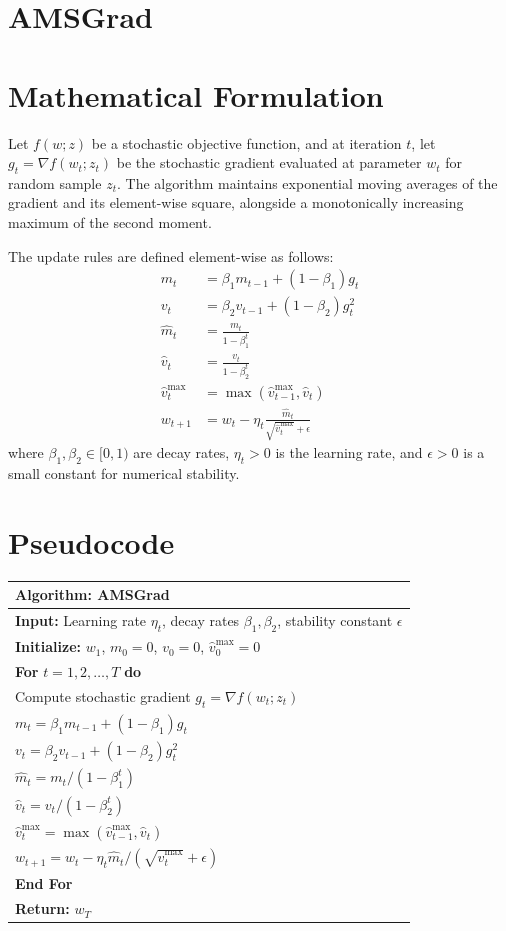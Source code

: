 \documentclass{article}
\begin{document}
\section*{AMSGrad}

\section*{Mathematical Formulation}
Let $f(w; z)$ be a stochastic objective function, and at iteration $t$, let $g_t = \nabla f(w_t; z_t)$ be the stochastic gradient evaluated at parameter $w_t$ for random sample $z_t$. The algorithm maintains exponential moving averages of the gradient and its element-wise square, alongside a monotonically increasing maximum of the second moment. 

The update rules are defined element-wise as follows:
\begin{align}
m_t &= \beta_1 m_{t-1} + (1-\beta_1) g_t \\
v_t &= \beta_2 v_{t-1} + (1-\beta_2) g_t^2 \\
\hat{m}_t &= \frac{m_t}{1-\beta_1^t} \\
\hat{v}_t &= \frac{v_t}{1-\beta_2^t} \\
\hat{v}_t^{\max} &= \max(\hat{v}_{t-1}^{\max}, \hat{v}_t) \\
w_{t+1} &= w_t - \eta_t \frac{\hat{m}_t}{\sqrt{\hat{v}_t^{\max}} + \epsilon}
\end{align}
where $\beta_1, \beta_2 \in [0,1)$ are decay rates, $\eta_t > 0$ is the learning rate, and $\epsilon > 0$ is a small constant for numerical stability.

\section*{Pseudocode}
\begin{center}
\begin{tabular}{l}
\hline
\textbf{Algorithm:} AMSGrad \\
\hline
\textbf{Input:} Learning rate $\eta_t$, decay rates $\beta_1, \beta_2$, stability constant $\epsilon$ \\
\textbf{Initialize:} $w_1$, $m_0 = 0$, $v_0 = 0$, $\hat{v}_0^{\max} = 0$ \\
\textbf{For} $t = 1, 2, \dots, T$ \textbf{do} \\
\quad Compute stochastic gradient $g_t = \nabla f(w_t; z_t)$ \\
\quad $m_t = \beta_1 m_{t-1} + (1-\beta_1) g_t$ \\
\quad $v_t = \beta_2 v_{t-1} + (1-\beta_2) g_t^2$ \\
\quad $\hat{m}_t = m_t / (1-\beta_1^t)$ \\
\quad $\hat{v}_t = v_t / (1-\beta_2^t)$ \\
\quad $\hat{v}_t^{\max} = \max(\hat{v}_{t-1}^{\max}, \hat{v}_t)$ \\
\quad $w_{t+1} = w_t - \eta_t \hat{m}_t / (\sqrt{\hat{v}_t^{\max}} + \epsilon)$ \\
\textbf{End For} \\
\textbf{Return:} $w_T$ \\
\hline
\end{tabular}
\end{center}
\end{document}
